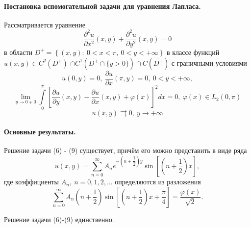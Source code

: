 \begin{vkrthesis}
\paragraph{Постановка вспомогательной задачи для уравнения Лапласа.}
Рассматривается уравнение
\begin{equation}
	\dfrac{\partial^2 u}{\partial x^2}(x,y) + \dfrac{\partial^2 u}{\partial y^2}(x,y) = 0
\end{equation}
в области $D^{+} = \left\{(x,y): \ 0 < x < \pi, \ 0 < y < + \infty \right\}$ в классе функций $u(x,y) \in  C^2(D^+) $ $ \cap C^1(\overline{D^+} \cap \{y > 0\}) \cap C(\overline{D^+})$ 
с граничными условиями 
\begin{equation}
	u(0,y) = 0, \ \dfrac{\partial u}{\partial x}(\pi, y) = 0, \ 0 < y < +\infty, 
\end{equation}
\begin{equation}
	\lim\limits_{y \to 0+0} \int\limits_0^\pi \left[\dfrac{\partial u}{\partial y}(x, y) - \dfrac{\partial u}{\partial x}(x,y) + \varphi(x) \right]^2   dx = 0, \ \varphi(x) \in L_2(0, \pi)
\end{equation}
\begin{equation}
	u(x,y) \rightrightarrows 0, \ y \to +\infty 
\end{equation}
\paragraph{Основные результаты.}


\begin{theorem}
	\label{th:fivebf}
	Решение задачи (6) - (9) существует, причём его можно представить в виде ряда
	\begin{equation}
		u(x,y) = \sum\limits_{n=0}^{\infty} A_n e^{-\left(n + \dfrac12\right)y} \sin{\left[\left(n + \dfrac12\right)x\right]},
	\end{equation}
	где коэффициенты $A_n, \ n =0,1,2, \dots$ определяются из разложения
	\begin{equation}
		\sum\limits_{n=0}^{\infty} A_n \left(n + \dfrac12 \right) \sin{\left[\left(n +\dfrac12\right)x + \dfrac\pi4\right]} = \dfrac{\varphi(x)}{\sqrt2}.
	\end{equation}
\end{theorem}

\begin{theorem}
	\label{th:fivebf}
	Решение задачи (6)-(9) единственно.
\end{theorem}



\end{vkrthesis}
